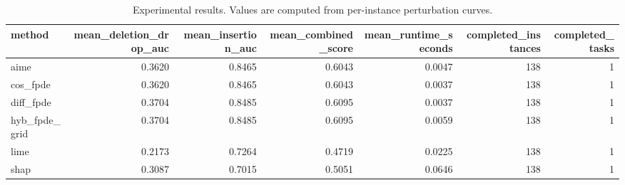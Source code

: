 \begin{table}[t]
\caption{Experimental results. Values are computed from per-instance perturbation curves.}
\label{tab:main_results_computed}
\centering
\begin{tabular}{lrrrrrr}
\toprule
method & mean\_deletion\_drop\_auc & mean\_insertion\_auc & mean\_combined\_score & mean\_runtime\_seconds & completed\_instances & completed\_tasks \\
\midrule
aime & 0.3620 & 0.8465 & 0.6043 & 0.0047 & 138 & 1 \\
cos\_fpde & 0.3620 & 0.8465 & 0.6043 & 0.0037 & 138 & 1 \\
diff\_fpde & 0.3704 & 0.8485 & 0.6095 & 0.0037 & 138 & 1 \\
hyb\_fpde\_grid & 0.3704 & 0.8485 & 0.6095 & 0.0059 & 138 & 1 \\
lime & 0.2173 & 0.7264 & 0.4719 & 0.0225 & 138 & 1 \\
shap & 0.3087 & 0.7015 & 0.5051 & 0.0646 & 138 & 1 \\
\bottomrule
\end{tabular}

\end{table}

